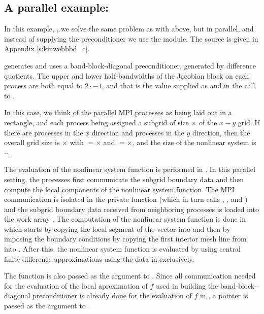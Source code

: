 
\subsection{A parallel example: }\label{ss:kinwebbbd}

In this example, , we solve the same problem as with 
above, but in parallel, and instead of supplying the preconditioner we use the
{\kinbbdpre} module.  The source is given in Appendix \ref{s:kinwebbbd_c}.

{\kinbbdpre} generates and uses a band-block-diagonal preconditioner, generated
by difference quotients.  The upper and lower half-bandwidths of the Jacobian block
on each process are both equal to $2\cdot$$-1$, and that is the
value supplied as  and  in the call to . 

In this case, we think of the parallel MPI processes as
being laid out in a rectangle, and each process being assigned a
subgrid of size $\times$ of the $x-y$ grid. If
there are  processes in the $x$ direction and 
processes in the $y$ direction, then the overall grid size is
$\times$ with $=$$\times$ and
$=$$\times$, and the size of the nonlinear system is
$\cdot$$\cdot$.  

The evaluation of the nonlinear system function is performed in .
In this parallel setting, the processes first communicate
the subgrid boundary data and then compute the local components of the nonlinear
system function. The MPI communication is isolated in the private function 
(which in turn calls , , and ) and the 
subgrid boundary data received from neighboring processes is loaded into the
work array . The computation of the nonlinear system function is done
in  which starts by copying the local segment of the  vector into
 and then by imposing the boundary conditions by copying the first interior
mesh line from  into . After this, the nonlinear system function is 
evaluated by using central finite-difference approximations using the data in 
exclusively.

The function  is also passed as the  argument to 
. Since all communication needed for the evaluation of the
local aproximation of $f$ used in building the band-block-diagonal preconditioner
is already done for the evaluation of $f$ in , a  pointer is
passed as the  argument to .

